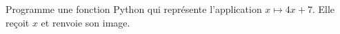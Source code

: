Programme une fonction Python qui représente l'application $x\mapsto4x+7$. Elle reçoit $x$ et renvoie son image.
